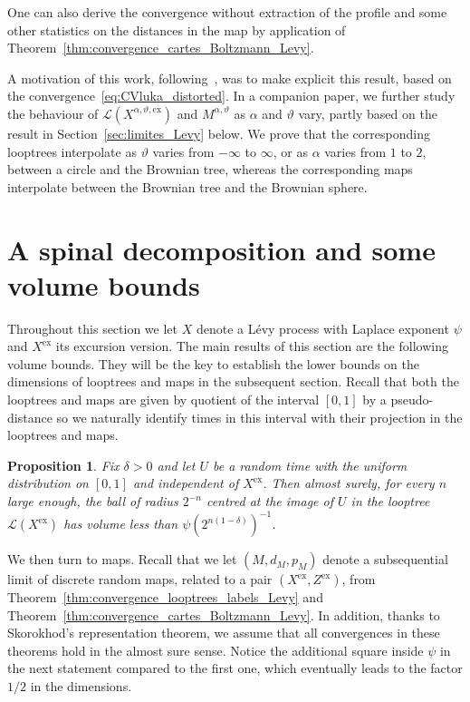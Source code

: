 \documentclass[british, a4paper,11pt]{article}
\numberwithin{equation}{section}
\newtheorem{prop}[thm]{Proposition}
\theoremstyle{definition}
\newcommand{\Loop}{\mathscr{L}}
\newcommand{\Map}{M}
\newcommand{\exc}{\mathrm{ex}}
\begin{document}
One can also derive the convergence without extraction of the profile and some other statistics on the distances in the map by application of Theorem~\ref{thm:convergence_cartes_Boltzmann_Levy}.

A motivation of this work, following~\cite{KM23}, was to make explicit this result, based on the convergence~\eqref{eq:CVluka_distorted}.
In a companion paper, we further study the behaviour of $\Loop(X^{\alpha, \vartheta, \exc})$ and $\Map^{\alpha, \vartheta}$ as $\alpha$ and $\vartheta$ vary, partly based  on the result in Section~\ref{sec:limites_Levy} below.
We prove that the corresponding looptrees interpolate as $\vartheta$ varies from $-\infty$ to $\infty$, or as $\alpha$ varies from $1$ to $2$, between a circle and the Brownian tree, whereas the corresponding maps interpolate between the Brownian tree and the Brownian sphere.


\section{A spinal decomposition and some volume bounds}
\label{sec:volume}

Throughout this section we let $X$ denote a L\'evy process with Laplace exponent $\psi$ and $X^{\exc}$ its excursion version.
The main results of this section are the following volume bounds. They will be the key to establish the lower bounds on the dimensions of looptrees and maps in the subsequent section. Recall that both the looptrees and maps are given by quotient of the interval $[0,1]$ by a pseudo-distance so we naturally identify times in this interval with their projection in the looptrees and maps.


\begin{prop}\label{prop:borne_sup_volume_boules_looptrees_psi}
Fix $\delta > 0$ and let $U$ be a random time with the uniform distribution on $[0,1]$ and independent of $X^{\exc}$.
Then almost surely, for every $n$ large enough, the ball of radius $2^{-n}$ centred at the image of $U$ in the looptree $\Loop(X^{\exc})$ has volume less than $\psi(2^{n(1-\delta)})^{-1}$.
\end{prop}


We then turn to maps. Recall that we let $(\Map,d_\Map,p_\Map)$ denote a subsequential limit of discrete random maps, related to a pair $(X^{\exc}, Z^{\exc})$, from Theorem~\ref{thm:convergence_looptrees_labels_Levy} and Theorem~\ref{thm:convergence_cartes_Boltzmann_Levy}. In addition, thanks to Skorokhod's representation theorem, we assume that all convergences in these theorems hold in the almost sure sense.
Notice the additional square inside $\psi$ in the next statement compared to the first one, which eventually leads to the factor $1/2$ in the dimensions.
\end{document}
